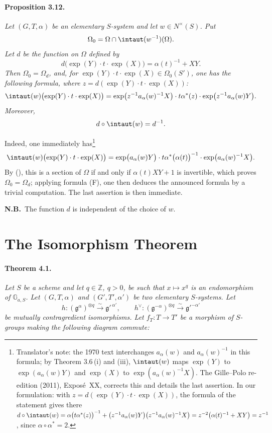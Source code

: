 \paragraph{\textbf{Proposition 3.12.}}
\emph{Let \((G,T,\alpha)\) be an elementary \(S\)-system and let
\(w\in N^\times(S)\).  Put}
\[
  \Omega_0=\Omega\cap\intaut(w^{-1})(\Omega).
\]
\emph{Let \(d\) be the function on \(\Omega\) defined by}
\[
  d\bigl(\exp(Y)\cdot t\cdot\exp(X)\bigr)
    =\alpha(t)^{-1}+XY.
\]
\emph{Then \(\Omega_0=\Omega_d\), and, for
\(\exp(Y)\cdot t\cdot\exp(X)\in\Omega_0(S')\), one has the following
formula, where
\(z=d(\exp(Y)\cdot t\cdot\exp(X))\):}
\[
  \intaut(w)\bigl(\exp(Y)\cdot t\cdot\exp(X)\bigr)
  =
  \exp\bigl(z^{-1}a_\alpha(w)^{-1}X\bigr)\cdot
  t\alpha^\ast(z)\cdot
  \exp\bigl(z^{-1}a_\alpha(w)Y\bigr).
\]
\emph{Moreover,}
\[
  d\circ\intaut(w)=d^{-1}.
\]

Indeed, one immediately has\footnote{Translator's note: the 1970 text interchanges
\(a_\alpha(w)\) and \(a_\alpha(w)^{-1}\) in this formula; by Theorem 3.6\,(i) and (iii),
\(\intaut(w)\) maps \(\exp(Y)\) to \(\exp(a_\alpha(w)Y)\) and \(\exp(X)\) to
\(\exp(a_\alpha(w)^{-1}X)\). The Gille--Polo re-edition (2011), Exposé~XX, corrects this and
details the last assertion. In our formulation: with \(z=d(\exp(Y)\cdot t\cdot\exp(X))\), the
formula of the statement gives there \(d\circ\intaut(w)=\alpha\bigl(t\alpha^\ast(z)\bigr)^{-1}
+\bigl(z^{-1}a_\alpha(w)Y\bigr)\bigl(z^{-1}a_\alpha(w)^{-1}X\bigr)
=z^{-2}\bigl(\alpha(t)^{-1}+XY\bigr)=z^{-1}\), since \(\alpha\circ\alpha^\ast=2\).}
\[
  \intaut(w)\bigl(\exp(Y)\cdot t\cdot\exp(X)\bigr)
   =\exp\bigl(a_\alpha(w)Y\bigr)\cdot
   t\alpha^\ast\bigl(\alpha(t)\bigr)^{-1}\cdot
   \exp\bigl(a_\alpha(w)^{-1}X\bigr).
\]
By \textup{()}, this is a section of \(\Omega\) if and only if
\(\alpha(t)XY+1\) is invertible, which proves
\(\Omega_0=\Omega_d\); applying formula \textup{(F)}, one then deduces the
announced formula by a trivial computation. The last assertion is
then immediate.

\smallskip
\noindent\textbf{N.B.}\ The function \(d\) is independent of the
choice of \(w\).

\section{The Isomorphism Theorem}

\paragraph{\textbf{Theorem 4.1.}}
\emph{Let \(S\) be a scheme and let \(q\in\mathbb Z\), \(q>0\), be
such that \(x\mapsto x^q\) is an endomorphism of
\(\mathbb G_{a,S}\).  Let \((G,T,\alpha)\) and
\((G',T',\alpha')\) be two elementary \(S\)-systems.  Let}
\[
  h\colon(\mathfrak g^\alpha)^{\otimes q}
      \xrightarrow{\ \sim\ }\mathfrak g'^{\,\alpha'},
  \qquad
  h^\vee\colon(\mathfrak g^{-\alpha})^{\otimes q}
      \xrightarrow{\ \sim\ }\mathfrak g'^{-\alpha'}
\]
\emph{be mutually contragredient isomorphisms.  Let
\(f_T\colon T\to T'\) be a morphism of \(S\)-groups making the
following diagram commute:}

